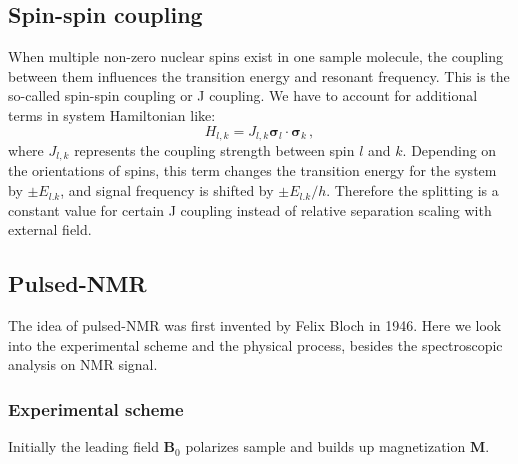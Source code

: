 \subsection{Spin-spin coupling}

When multiple non-zero nuclear spins exist in one sample molecule, the coupling between them influences the transition energy and resonant frequency. This is the so-called spin-spin coupling or J coupling. We have to account for additional terms in system Hamiltonian like:
\begin{equation}
    H_{l,k}  = J_{l,k} \mathbf{\sigma}_l \cdot \mathbf{\sigma}_k\,,
\end{equation}
where $J_{l,k}$ represents the coupling strength between spin $l$ and $k$. Depending on the orientations of spins, this term changes the transition energy for the system by $\pm E_{l.k}$, and signal frequency is shifted by $\pm E_{l.k}/h$. Therefore the splitting is a constant value for certain J coupling instead of relative separation scaling with external field. 

\subsection{Pulsed-NMR}\label{sec:NMR:Pulsed-NMR}


The idea of pulsed-NMR was first invented by Felix Bloch in 1946\cite{Bloch_NuclearInduction_PhysRev.70.460}. Here we look into the experimental scheme and the physical process, besides the spectroscopic analysis on NMR signal. 

\subsubsection{Experimental scheme}
Initially the leading field $\mathbf{B}_0$ polarizes sample and builds up magnetization $\mathbf{M}$. 

